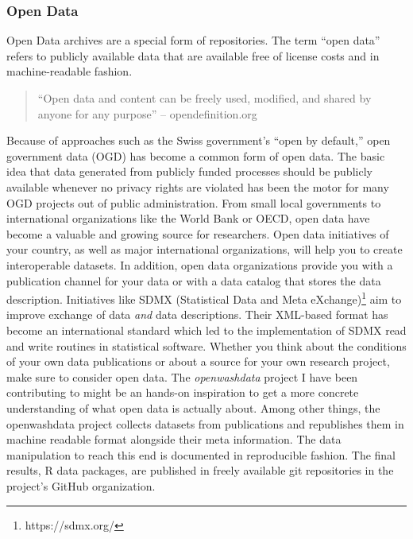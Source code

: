 \documentclass[
  12pt,
  letterpaper,
]{krantz}
\begin{document}
\hypertarget{open-data}{%
\subsubsection*{Open Data}\label{open-data}}

Open Data archives are a special form of repositories.
The term ``open data'' refers to publicly available data that are
available free of license costs and in machine-readable fashion.

\begin{quote}
``Open data and content can be freely used, modified, and shared by
anyone for any purpose'' -- opendefinition.org
\end{quote}

Because of approaches such as the Swiss government's ``open by
default,'' open government data (OGD) has become a common form of open
data. The basic idea that data generated from publicly funded processes
should be publicly available whenever no privacy rights are violated has
been the motor for many OGD projects out of public administration. From
small local governments to international organizations like the World
Bank or OECD, open data have become a valuable and growing source for
researchers. Open data initiatives of your country, as well as major
international organizations, will help you to create interoperable
datasets. In addition, open data organizations provide you with a
publication channel for your data or with a data catalog that stores the
data description. Initiatives like SDMX (Statistical Data and Meta
eXchange)\footnote{https://sdmx.org/} aim to improve
exchange of data \emph{and} data descriptions. Their XML-based format
has become an international standard which led to the implementation of
SDMX read and write routines in statistical software. Whether you think
about the conditions of your own data publications or about a source for
your own research project, make sure to consider open data. The
\emph{openwashdata} project I have been contributing to might be an
hands-on inspiration to get a more concrete understanding of what open
data is actually about. Among other things, the openwashdata project
collects datasets from publications and republishes them in machine
readable format alongside their meta information. The data manipulation
to reach this end is documented in reproducible fashion. The final
results, R data packages, are published in freely available git
repositories in the project's GitHub organization.
\end{document}
